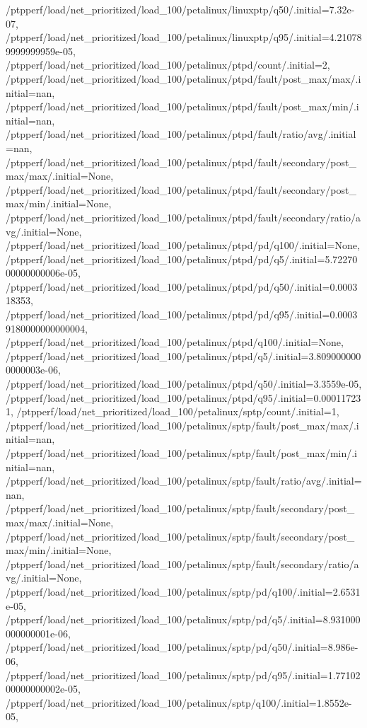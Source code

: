 {    /ptpperf/load/net_prioritized/load_100/petalinux/linuxptp/q50/.initial=7.32e-07,
    /ptpperf/load/net_prioritized/load_100/petalinux/linuxptp/q95/.initial=4.210789999999959e-05,
    /ptpperf/load/net_prioritized/load_100/petalinux/ptpd/count/.initial=2,
    /ptpperf/load/net_prioritized/load_100/petalinux/ptpd/fault/post_max/max/.initial=nan,
    /ptpperf/load/net_prioritized/load_100/petalinux/ptpd/fault/post_max/min/.initial=nan,
    /ptpperf/load/net_prioritized/load_100/petalinux/ptpd/fault/ratio/avg/.initial=nan,
    /ptpperf/load/net_prioritized/load_100/petalinux/ptpd/fault/secondary/post_max/max/.initial=None,
    /ptpperf/load/net_prioritized/load_100/petalinux/ptpd/fault/secondary/post_max/min/.initial=None,
    /ptpperf/load/net_prioritized/load_100/petalinux/ptpd/fault/secondary/ratio/avg/.initial=None,
    /ptpperf/load/net_prioritized/load_100/petalinux/ptpd/pd/q100/.initial=None,
    /ptpperf/load/net_prioritized/load_100/petalinux/ptpd/pd/q5/.initial=5.7227000000000006e-05,
    /ptpperf/load/net_prioritized/load_100/petalinux/ptpd/pd/q50/.initial=0.000318353,
    /ptpperf/load/net_prioritized/load_100/petalinux/ptpd/pd/q95/.initial=0.00039180000000000004,
    /ptpperf/load/net_prioritized/load_100/petalinux/ptpd/q100/.initial=None,
    /ptpperf/load/net_prioritized/load_100/petalinux/ptpd/q5/.initial=3.8090000000000003e-06,
    /ptpperf/load/net_prioritized/load_100/petalinux/ptpd/q50/.initial=3.3559e-05,
    /ptpperf/load/net_prioritized/load_100/petalinux/ptpd/q95/.initial=0.000117231,
    /ptpperf/load/net_prioritized/load_100/petalinux/sptp/count/.initial=1,
    /ptpperf/load/net_prioritized/load_100/petalinux/sptp/fault/post_max/max/.initial=nan,
    /ptpperf/load/net_prioritized/load_100/petalinux/sptp/fault/post_max/min/.initial=nan,
    /ptpperf/load/net_prioritized/load_100/petalinux/sptp/fault/ratio/avg/.initial=nan,
    /ptpperf/load/net_prioritized/load_100/petalinux/sptp/fault/secondary/post_max/max/.initial=None,
    /ptpperf/load/net_prioritized/load_100/petalinux/sptp/fault/secondary/post_max/min/.initial=None,
    /ptpperf/load/net_prioritized/load_100/petalinux/sptp/fault/secondary/ratio/avg/.initial=None,
    /ptpperf/load/net_prioritized/load_100/petalinux/sptp/pd/q100/.initial=2.6531e-05,
    /ptpperf/load/net_prioritized/load_100/petalinux/sptp/pd/q5/.initial=8.931000000000001e-06,
    /ptpperf/load/net_prioritized/load_100/petalinux/sptp/pd/q50/.initial=8.986e-06,
    /ptpperf/load/net_prioritized/load_100/petalinux/sptp/pd/q95/.initial=1.7710200000000002e-05,
    /ptpperf/load/net_prioritized/load_100/petalinux/sptp/q100/.initial=1.8552e-05,
}
